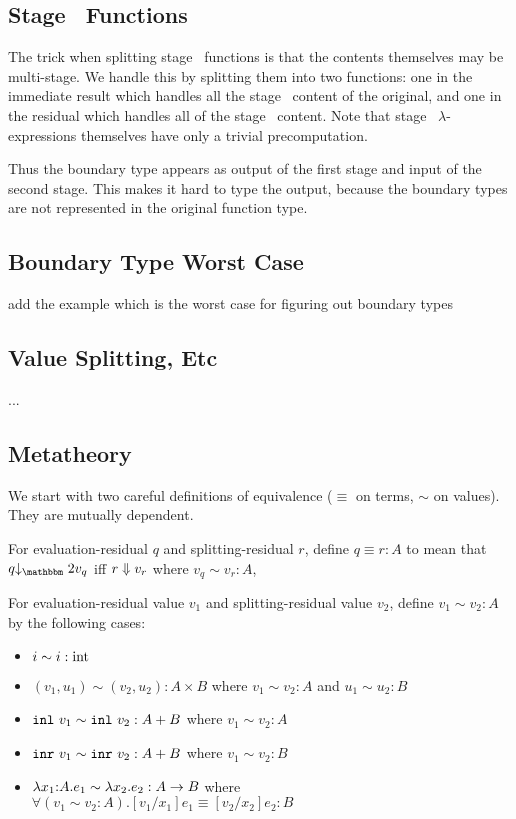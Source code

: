 \subsection {Stage \bbone\ Functions}

The trick when splitting stage \bbone\ functions is that the contents themselves may be multi-stage.
We handle this by splitting them into two functions:
one in the immediate result which handles all the stage \bbone\ content of the original,
and one in the residual which handles all of the stage \bbtwo\ content.
Note that stage \bbone\ $\lambda$-expressions themselves have only a trivial precomputation.


Thus the boundary type appears as output of the first stage and input of the second stage.
This makes it hard to type the output, because the boundary types are not represented in the original function type.

\subsection {Boundary Type Worst Case}

\TODO add the example which is the worst case for figuring out boundary types



\subsection{Value Splitting, Etc}

...

\subsection{Metatheory}

We start with two careful definitions of equivalence ($\equiv$ on terms, $\sim$ on values).  They are mutually dependent.

\begin{definition}
For evaluation-residual $q$ and splitting-residual $r$, define $q \equiv r : A$ to mean that 
$q \tworedsym v_q$ iff ${r} \Downarrow {v_r}$ where $v_q \sim v_r : A$, 
\end{definition}

\begin{definition}
For evaluation-residual value $v_1$ and splitting-residual value $v_2$, define $v_1 \sim v_2 : A$ by the following cases:
\begin{itemize}
\item $i \sim i : {\rm int}$
\item $(v_1,u_1) \sim (v_2,u_2) : A \times B$ where $v_1 \sim v_2 : A$ and $u_1 \sim u_2 : B$
\item ${\tt inl}~v_1 \sim {\tt inl}~v_2 : A + B$ where $v_1 \sim v_2 : A$
\item ${\tt inr}~v_1 \sim {\tt inr}~v_2 : A + B$ where $v_1 \sim v_2 : B$
\item $\lambda{x_1}\mathrm{:}{A}.{e_1} \sim \lambda x_2.e_2 : A \to B$ where \\ $\forall (v_1 \sim v_2 : A). [v_1/x_1]e_1 \equiv [v_2/x_2]e_2 : B$
\end{itemize}
\end{definition}

